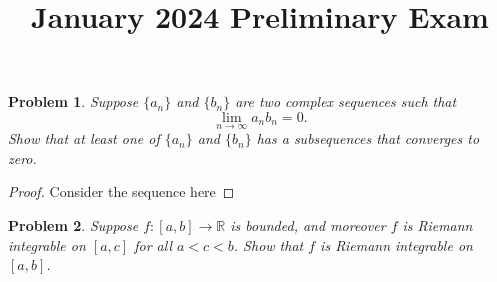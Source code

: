 \documentclass[11pt,twoside]{amsart}
\title{January 2024 Preliminary Exam}
\author{}
\theoremstyle{plain}
\newtheorem{prob}{Problem}
\newcommand{\RR}{\mathbb{R}}
\begin{document}
\maketitle

\begin{prob}
  Suppose $\{a_n\}$ and $\{b_n\}$ are two complex sequences such that 
  \begin{equation*}
    \lim_{n \to \infty}{a_n b_n} = 0.
  \end{equation*}
  Show that at least one of $\{a_n\}$ and $\{b_n\}$ has a subsequences that converges to zero.
\end{prob}
\begin{proof}
  Consider the sequence here
\end{proof}

\begin{prob}
  Suppose $f: [a,b] \to \RR$ is bounded, and moreover $f$ is Riemann integrable on $[a,c]$
  for all $a < c < b$. Show that $f$ is Riemann integrable on $[a,b]$. 
\end{prob}
    
\end{document}
